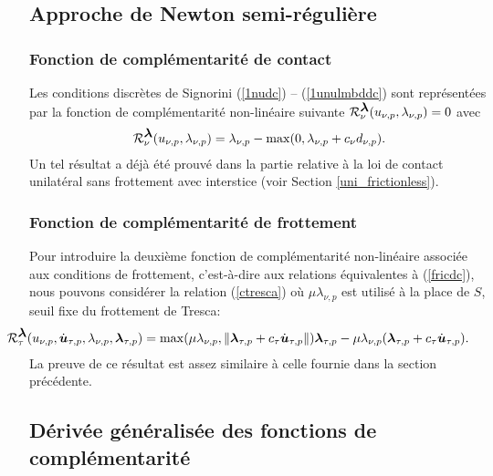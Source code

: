 \subsection{Approche de Newton semi-régulière}\label{Activeset_type}

\subsubsection{Fonction de complémentarité de contact}\label{comp_cont}

Les conditions discrètes de Signorini (\ref{1nudc}) -- (\ref{1unulmbddc}) sont représentées par la fonction de complémentarité non-linéaire suivante ${\cal R}_{\nu}^{\mbox{\boldmath{$\lambda$}}}(u_{\nu, p},\lambda_{\nu, p})=0$ avec
\begin{align}\label{phi1}
{\cal R}_{\nu}^{\mbox{\boldmath{$\lambda$}}}(u_{\nu, p},\lambda_{\nu, p})=\lambda_{\nu, p}-\max(0,\lambda_{\nu, p}+c_{\nu}d_{\nu,p}).
\end{align}
Un tel résultat a déjà été prouvé dans la partie relative à la loi de contact unilatéral sans frottement avec interstice (voir Section \ref{uni_frictionless}).

\subsubsection{Fonction de complémentarité de frottement}\label{comp_cont}

 Pour introduire la deuxième fonction de complémentarité non-linéaire associée aux conditions de frottement, c'est-à-dire aux relations équivalentes à (\ref{fricdc}), nous pouvons considérer la relation (\ref{ctresca}) où $\mu \lambda_{\nu,p}$ est utilisé à la place de $S$, seuil fixe du frottement de Tresca:
\begin{align}\label{ccoulomb}
&\hspace{-8mm}{\cal R}_{\tau}^{\blambda}(u_{\nu, p},\dot\bu_{\tau, p},\lambda_{\nu, p},\blambda_{\tau, p})=\max ( \mu \lambda_{\nu, p}, \|\blambda_{\tau, p}+c_\tau \dot\bu_{\tau, p}\|)\blambda_{\tau, p}- \mu \lambda_{\nu, p}(\blambda_{\tau, p}+c_\tau \dot\bu_{\tau, p}).
\end{align}
La preuve de ce résultat est assez similaire à celle fournie dans la section précédente.

\subsection{Dérivée généralisée des fonctions de complémentarité}

